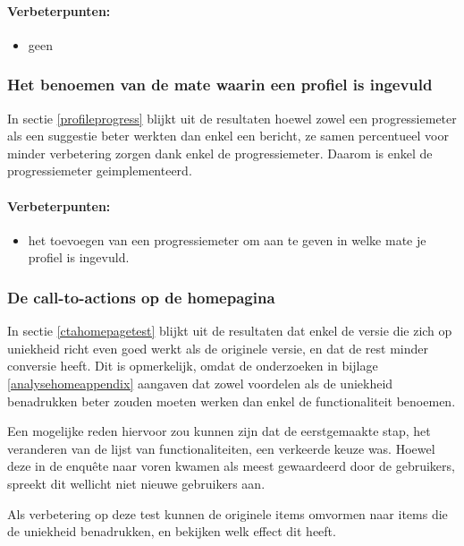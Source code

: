 \documentclass[a4paper, 10pt, pdftex]{report}
\begin{document}
    \paragraph{\textbf{Verbeterpunten:}}
      \begin{itemize}
        \item geen
      \end{itemize}

      \subsubsection{Het benoemen van de mate waarin een profiel is ingevuld}
        In sectie \ref{profileprogress} blijkt uit de resultaten hoewel zowel een progressiemeter als een suggestie beter werkten dan enkel een bericht, ze samen percentueel voor minder verbetering zorgen dank enkel de progressiemeter. Daarom is enkel de progressiemeter geimplementeerd.

    \paragraph{\textbf{Verbeterpunten:}}
      \begin{itemize}
        \item het toevoegen van een progressiemeter om aan te geven in welke mate je profiel is ingevuld.
      \end{itemize}

     \subsubsection{De call-to-actions op de homepagina}
      \label{wak:ctahome}
      In sectie \ref{ctahomepagetest} blijkt uit de resultaten dat enkel de versie die zich op uniekheid richt even goed werkt als de originele versie, en dat de rest minder conversie heeft. Dit is opmerkelijk, omdat de onderzoeken in bijlage \ref{analysehomeappendix} aangaven dat zowel voordelen als de uniekheid benadrukken beter zouden moeten werken dan enkel de functionaliteit benoemen.

      Een mogelijke reden hiervoor zou kunnen zijn dat de eerstgemaakte stap, het veranderen van de lijst van functionaliteiten, een verkeerde keuze was. Hoewel deze in de enqu\^ete naar voren kwamen als meest gewaardeerd door de gebruikers, spreekt dit wellicht niet nieuwe gebruikers aan.

      Als verbetering op deze test kunnen de originele items omvormen naar items die de uniekheid benadrukken, en bekijken welk effect dit heeft.
\end{document}
